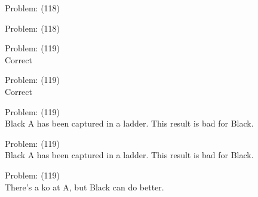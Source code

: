 \documentclass[11pt]{article}
\begin{document}
\begin{minipage}[t]{0.5\textwidth}
  {\centering
  
Problem: (118)\\
  }
\end{minipage}
\begin{minipage}[t]{0.5\textwidth}
  {\centering
  
Problem: (118)\\
  }
\end{minipage}
\begin{minipage}[t]{0.5\textwidth}
  {\centering
  
Problem: (119)\\
Correct\\
  }
\end{minipage}
\begin{minipage}[t]{0.5\textwidth}
  {\centering
  
Problem: (119)\\
Correct\\
  }
\end{minipage}
\begin{minipage}[t]{0.5\textwidth}
  {\centering
  
Problem: (119)\\
Black A has been captured in a ladder. This result is bad for Black.\\
  }
\end{minipage}
\begin{minipage}[t]{0.5\textwidth}
  {\centering
  
Problem: (119)\\
Black A has been captured in a ladder. This result is bad for Black.\\
  }
\end{minipage}
\begin{minipage}[t]{0.5\textwidth}
  {\centering
  
Problem: (119)\\
There's a ko at A, but Black can do better.\\
  }
\end{minipage}
\end{document}
